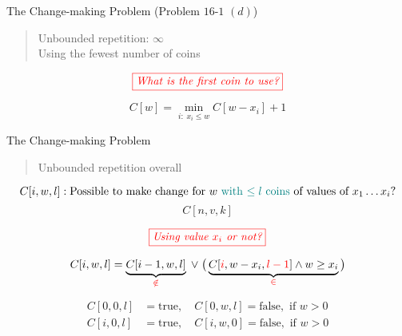 \begin{frame}{}
  \begin{exampleblock}{The Change-making Problem (Problem $16$-$1$ $(d)$)}
    \begin{quote}
      \centering
      Unbounded repetition: $\infty$ \\[8pt]
      Using the fewest number of coins
    \end{quote}
  \end{exampleblock}

  \[
    \textcolor{red}{\fbox{\it What is the first coin to use?}}
  \]

  \vspace{0.30cm}
  \[
    C[w] = \min_{i: \; x_i \le w} C[w-x_i] + 1
  \]
\end{frame}

\begin{frame}{}
  \begin{exampleblock}{The Change-making Problem}
    \begin{quote}
      \centering
      Unbounded repetition  overall
    \end{quote}
  \end{exampleblock}

  \pause
  \[
    C[i,w,l]: \text{Possible to make change for $w$ \textcolor{teal}{with $\le l$ coins} of values of $x_{1} \dots x_{i}$?}
  \]
  \[
    C[n,v,k]
  \]

  \pause
  \[
    \textcolor{red}{\fbox{\it Using value $x_{i}$ or not?}}
  \]

  \pause
  \[
    C[i,w,l] = \underbrace{C[i-1,w,l]}_{\textcolor{red}{\notin}} \;\lor\; 
    	\big(\underbrace{C[\textcolor{red}{i}, w-x_{i}, \textcolor{red}{l-1}] \land w \ge x_{i}}_{\textcolor{red}{\in}} \big)
  \]

  \pause
  \begin{align*}
    C[0,0,l] &= \text{true}, \quad C[0,w,l] = \text{false}, \text{ if } w > 0 \\
    C[i,0,l] &= \text{true}, \quad C[i,w,0] = \text{false}, \text{ if } w > 0
  \end{align*}
\end{frame}

